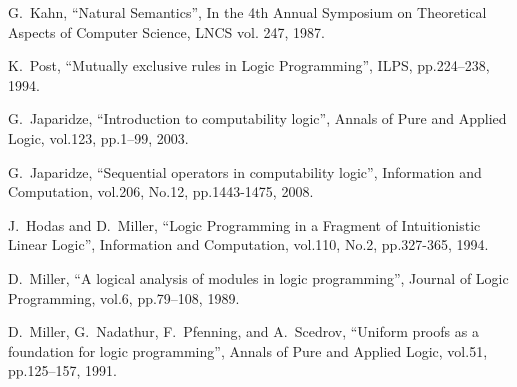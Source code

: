 \documentclass[12pt]{article}
\begin{document}

\begin{thebibliography}{1}

G.~Kahn,  ``Natural Semantics'', In the 4th Annual Symposium on Theoretical Aspects of Computer Science, 
LNCS vol. 247,  1987.

K.~Post, ``Mutually exclusive rules in Logic Programming'', ILPS, pp.224--238, 1994.

G.~Japaridze, ``Introduction to computability logic'', Annals  of Pure and
 Applied  Logic, vol.123, pp.1--99, 2003.

G.~Japaridze,   ``Sequential operators in computability logic'',
 Information and Computation, vol.206, No.12, pp.1443-1475, 2008.  

J.~Hodas and D.~Miller,   ``Logic Programming in a Fragment of Intuitionistic Linear Logic'', 
 Information and Computation, vol.110, No.2, pp.327-365, 1994. 

D.~Miller, ``A logical analysis of modules in logic programming'', Journal of
  Logic Programming, vol.6, pp.79--108, 1989.

D.~Miller, G.~Nadathur, F.~Pfenning, and A.~Scedrov, ``Uniform proofs as a
  foundation for logic programming'', Annals of Pure and Applied Logic, vol.51,
  pp.125--157, 1991.

\end{thebibliography}
\end{document}
